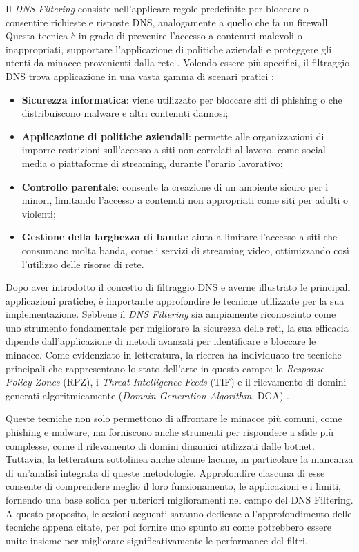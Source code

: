Il \textit{DNS Filtering} consiste nell'applicare regole predefinite per bloccare o consentire richieste e risposte DNS, analogamente a quello che fa un firewall. Questa tecnica è in grado di prevenire l'accesso a contenuti malevoli o inappropriati, supportare l'applicazione di politiche aziendali e proteggere gli utenti da minacce provenienti dalla rete \cite{Magnusson2024}. Volendo essere più specifici, il filtraggio DNS trova applicazione in una vasta gamma di scenari pratici \cite{Murdoch2008, Varadharajan2010}:
\begin{itemize}
  \item \textbf{Sicurezza informatica}: viene utilizzato per bloccare siti di phishing o che distribuiscono malware e altri contenuti dannosi;

  \item \textbf{Applicazione di politiche aziendali}: permette alle organizzazioni di imporre restrizioni sull'accesso a siti non correlati al lavoro, come social media o piattaforme di streaming, durante l'orario lavorativo;

  \item \textbf{Controllo parentale}: consente la creazione di un ambiente sicuro per i minori, limitando l'accesso a contenuti non appropriati come siti per adulti o violenti;

  \item \textbf{Gestione della larghezza di banda}: aiuta a limitare l'accesso a siti che consumano molta banda, come i servizi di streaming video, ottimizzando così l'utilizzo delle risorse di rete.
\end{itemize}

Dopo aver introdotto il concetto di filtraggio DNS e averne illustrato le principali applicazioni pratiche, è importante approfondire le tecniche utilizzate per la sua implementazione. Sebbene il \textit{DNS Filtering} sia ampiamente riconosciuto come uno strumento fondamentale per migliorare la sicurezza delle reti, la sua efficacia dipende dall'applicazione di metodi avanzati per identificare e bloccare le minacce. Come evidenziato in letteratura, la ricerca ha individuato tre tecniche principali che rappresentano lo stato dell'arte in questo campo: le \textit{Response Policy Zones} (RPZ), i \textit{Threat Intelligence Feeds} (TIF) e il rilevamento di domini generati algoritmicamente (\textit{Domain Generation Algorithm}, DGA) \cite{Magnusson2024}.

Queste tecniche non solo permettono di affrontare le minacce più comuni, come phishing e malware, ma forniscono anche strumenti per rispondere a sfide più complesse, come il rilevamento di domini dinamici utilizzati dalle botnet. Tuttavia, la letteratura sottolinea anche alcune lacune, in particolare la mancanza di un'analisi integrata di queste metodologie. Approfondire ciascuna di esse consente di comprendere meglio il loro funzionamento, le applicazioni e i limiti, fornendo una base solida per ulteriori miglioramenti nel campo del DNS Filtering. A questo proposito, le sezioni seguenti saranno dedicate all'approfondimento delle tecniche appena citate, per poi fornire uno spunto su come potrebbero essere unite insieme per migliorare significativamente le performance del filtri.


